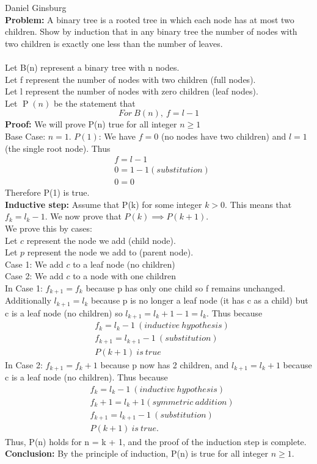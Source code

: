 \documentclass{article}
\begin{document}
Daniel Ginsburg\\
\textbf{Problem:} A binary tree is a rooted tree in which each node has at most two
children. Show by induction that in any binary tree the number of nodes
with two children is exactly one less than the number of leaves.\\ \\
Let B(n) represent a binary tree with n nodes.\\
Let f represent the number of nodes with two children (full nodes).\\
Let l represent the number of nodes with zero children (leaf nodes).\\
Let $\operatorname{P}(n)$ be the statement that 
\begin{equation}
    For\ B(n),\ f = l - 1
\end{equation}
\textbf{Proof:} We will prove P(n) true for all integer $n \geq 1$ \\
Base Case: $n = 1$. $P(1)$: We have $f = 0$ (no nodes have two children) and $l = 1$ (the single root node). Thus
\begin{align*}
    &f = l - 1 \\
    &0 = 1 - 1 (substitution)\\
    &0 = 0
\end{align*}
Therefore P(1) is true.\\
\textbf{Inductive step:} Assume that P(k) for some integer $k > 0$. This means that $f_k = l_k - 1$. We now prove that $P(k) \implies P(k+1)$.\\
We prove this by cases:\\
Let $c$ represent the node we add (child node).\\
Let $p$ represent the node we add to (parent node).\\
Case 1: We add $c$ to a leaf node (no children)\\
Case 2: We add $c$ to a node with one children\\
In Case 1: $f_{k+1} = f_k$ because p has only one child so f remains unchanged. Additionally $l_{k+1} = l_k$ because p is no longer a leaf node (it has c as a child) but c is a leaf node (no children) so $l_{k+1} = l_k+1-1 = l_k$. Thus because
\begin{align*}
    &f_k = l_k-1\ (inductive\ hypothesis)\\
    &f_{k+1} = l_{k+1} - 1\ (substitution)\\
    &P(k+1)\ is\ true 
\end{align*}
In Case 2: $f_{k+1} = f_k+1$ because p now has 2 children, and $l_{k+1} = l_k+1$ because c is a leaf node (no children). Thus because
\begin{align*}
    &f_k = l_k -1\ (inductive\ hypothesis)\\
    &f_k + 1 = l_k + 1 (symmetric\ addition)\\
    &f_{k+1} = l_{k+1} - 1\ (substitution)\\
    &P(k+1)\ is\ true.
\end{align*}
Thus, P(n) holds for n = k + 1, and the proof of the induction step is complete.
\textbf{Conclusion:} By the principle of induction, P(n) is true for all integer $n \geq 1$.\\
\end{document}

